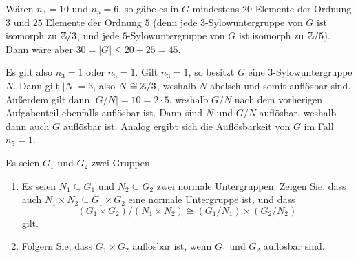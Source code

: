 \begin{solution}
\begin{enumerate}
      Wären $n_3 = 10$ und $n_5 = 6$, so gäbe es in $G$ mindestens $20$ Elemente der Ordnung $3$ und $25$ Elemente der Ordnung $5$ (denn jede $3$-Sylow\-unter\-gruppe von $G$ ist isomorph zu $\mathbb{Z}/3$, und jede $5$-Sylow\-unter\-gruppe von $G$ ist isomorph zu $\mathbb{Z}/5$).
      Dann wäre aber $30 = |G| \leq 20 + 25 = 45$.
      
      Es gilt also $n_3 = 1$ oder $n_5 = 1$.
      Gilt $n_3 = 1$, so besitzt $G$ eine $3$-Sylow\-unter\-gruppe $N$.
      Dann gilt $|N| = 3$, also $N \cong \mathbb{Z}/3$, weshalb $N$ abelsch und somit auflösbar sind.
      Außerdem gilt dann $|G/N| = 10 = 2 \cdot 5$, weshalb $G/N$ nach dem vorherigen Aufgabenteil ebenfalls auflösbar ist.
      Dann sind $N$ und $G/N$ auflösbar, weshalb dann auch $G$ auflösbar ist.
      Analog ergibt sich die Auflösbarkeit von $G$ im Fall $n_5 = 1$.
  \end{enumerate}
\end{solution}


\begin{question}[subtitle = Produkte von Normalteilern und auflösbaren Gruppen]
  Es seien $G_1$ und $G_2$ zwei Gruppen.
  \begin{enumerate}
    \item
      Es seien $N_1 \subseteq G_1$ und $N_2 \subseteq G_2$ zwei normale Untergruppen.
      Zeigen Sie, dass auch $N_1 \times N_2 \subseteq G_1 \times G_2$ eine normale Untergruppe ist, und dass
      \[
        (G_1 \times G_2)/(N_1 \times N_2) \cong (G_1/N_1) \times (G_2/N_2)
      \]
      gilt.
    \item
      Folgern Sie, dass $G_1 \times G_2$ auflösbar ist, wenn $G_1$ und $G_2$ auflösbar sind.
  \end{enumerate}
\end{question}


